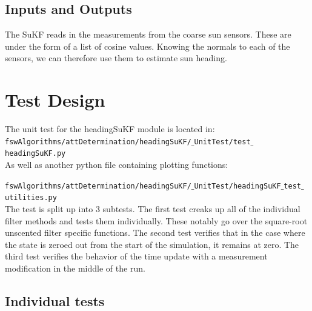 \documentclass[]{BasiliskReportMemo}
\begin{document}
\subsection{Inputs and Outputs}

The SuKF reads in the measurements from the coarse sun sensors. These are under the form of a list of cosine values. Knowing the normals to each of the sensors, we can therefore use them to estimate sun heading.


\section{Test Design}
The unit test for the headingSuKF module is located in:\\

\noindent
{\tt fswAlgorithms/attDetermination/headingSuKF/$\_$UnitTest/test$\_$headingSuKF.py} \\

As well as another python file containing plotting functions:

\noindent
{\tt fswAlgorithms/attDetermination/headingSuKF/$\_$UnitTest/headingSuKF$\_$test$\_$utilities.py} \\

The test is split up into 3 subtests. The first test creaks up all of the individual filter methods and tests them individually. These notably go over the square-root unscented filter specific functions. The second test verifies that in the case where the state is zeroed out from the start of the simulation, it remains at zero. The third test verifies the behavior of the time update with a measurement modification in the middle of the run. 

\subsection{Individual tests}
\end{document}
